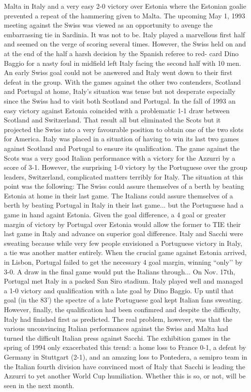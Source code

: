 Malta in Italy and a very easy 2-0 victory over Estonia where the Estonian 
goalie prevented a repeat of the hammering given to Malta.  The upcoming May 1,
1993 meeting against the Swiss was viewed as an opportunity to avenge the 
embarrassing tie in Sardinia. It was not to be. Italy played a marvellous first
half and seemed on the verge of scoring several times. However, the Swiss held 
on and at the end of the half a harsh decision by the Spanish referee to red-
card Dino Baggio for a nasty foul in midfield left Italy facing the second half
with 10 men. An early Swiss goal could not be answered and Italy went down to 
their first defeat in the group. With the games against the other two contenders,
Scotland and Portugal at home, Italy's situation was tense but not desperate 
especially since the Swiss had to visit both Scotland and Portugal. In the fall
of 1993 an easy victory against Estonia coincided with a problematic 1-1 draw 
between Scotland and Switzerland. That result all but eliminated the Scots but 
it projected the Swiss into a very favourable position to obtain one of the two
slots for America. Italy was placed in a situation of having to win its last 
two games against Scotland and Portugal to ensure its qualification. The game 
against the Scots was a very good Italian performance with a victory for the 
Azzurri by a score of 3-1. However, the surprising 1-0 victory by the Portuguese
over the group leaders, Switzerland, complicated matters terribly for Italy.
The situation at this point was the following: The Swiss could assure themselves
of a berth by beating Estonia at home in their last game. The Italians could 
assure themselves of a berth by beating Portugal in Italy in their last game...
but the Portuguese had a game in hand againt Estonia. Given the goal difference,
a 4 goal or greater margin of victory by Portugal over Estonia would allow the
former to TIE their last game in Italy and advance on superior goal difference.
Italy and Sacchi were sweating because while very few people envisioned a 
Portuguese victory in Italy, a tie was another matter entirely. When the 
crucial game against Estonia arrived, in Lisbon, Portugal failed to get the 
necessary 4 goal margin, winning ``only’’ by 3-0.  A draw in the final game would
put the Italians through... On Nov. 17th, Portugal met Italy in a packed San 
Siro stadium. Italy played well and managed a 1-0 victory and qualification with
a late goal by Dino Baggio. Up until that goal (in the 83') the spectre of a 
late Portuguese goal kept Italian fans sweating. However, finally, the 
qualification had been confimred and despite the difficulty, Italy had finished
first as predicted. The real problem, however, was that the various 
unconvincing Italian performances against the Swiss and Malta had turned the 
difficult Italian press against Sacchi. The exhibition games in the spring of 
1994 only exacerbated this trend: a home loss to France 0-1, a defeat by 
Germany in Stuttgart (2-1), and an amazing loss to Pontedera, a semipro team 
in the Italian fourth division have convinced most of Italy that Sacchi is 
leading the Azzurri to yet another World Cup humiliation. Whether this is so, 
or not, will be seen in the next month.
